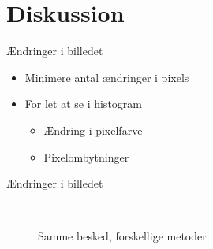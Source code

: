 \section{Diskussion} 
\begin{frame}{Ændringer i billedet}

	\begin{itemize}
		\setlength\itemsep{1em}
		\item Minimere antal ændringer i pixels
		\item For let at se i histogram
		\begin{itemize}
			\vspace*{1em}
			\setlength\itemsep{1em}
			\item<con@1->[$\times$] Ændring i pixelfarve
			\item<pro@1->[\checkmark] Pixelombytninger
		\end{itemize}
	\end{itemize}
\end{frame}

\begin{frame}{Ændringer i billedet}
	\begin{figure}
		\centering
		\begin{center}
		\end{center}
		~
		~
		\caption{Samme besked, forskellige metoder}
	\end{figure}
\end{frame}
